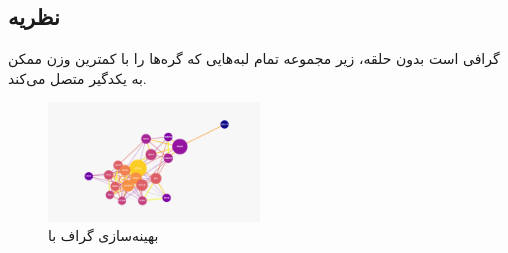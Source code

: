 \documentclass[10pt, a4paper]{article}
\begin{document}
\subsection{نظریه  \cite{enwiki:1213233694}}

گرافی است بدون حلقه، زیر مجموعه تمام لبه‌هایی که گره‌ها را با کمترین وزن ممکن به
یکدگیر متصل می‌کند.

\begin{figure}[H]
    \centering
    \includegraphics[width=0.5\textwidth]{images/betweenness_centrality_false.png}
    \caption{بهینه‌سازی گراف با }
    \label{fig: bc_mst_on}
\end{figure}

\newpage


\end{document}
